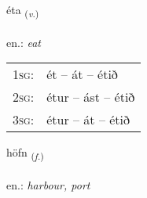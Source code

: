 \documentclass[frontgrid, backgrid]{flacards}\usepackage[]{graphicx}\usepackage[]{xcolor}
\begin{document}
\renewcommand{\flhead}{\vskip5pt \fboxsep=0pt {\small\bfseries\footnotesize Sagnorð | Verb}}
\renewcommand{\fcfoot}{\vskip5pt \fboxsep=0pt \hspace{2pt}{\small\bfseries\footnotesize 2K}}

\renewcommand{\blhead}{\vskip5pt {\small\bfseries\footnotesize Sagnorð | Verb }}
\renewcommand{\bcfoot}{\vskip5pt \hspace{2pt}{\small\bfseries\footnotesize 2K}}


{éta \small{\textsubscript{(\textit{v.})}} \\[1ex] %
\textphonetic{[jɛːta]} \\
en.: \emph{eat} \\  [2ex]
\renewcommand*{\arraystretch}{0.8}
\begin{tabular}{p{1cm}l}
\textsc{1sg}: & ét -- át -- étið \\ 
\textsc{2sg}: & étur -- ást -- étið \\ 
\textsc{3sg}: & étur -- át -- étið \\ 
\end{tabular}
}

\renewcommand{\flhead}{\vskip5pt \fboxsep=0pt {\small\bfseries\footnotesize Nafnorð | Noun}}
\renewcommand{\fcfoot}{\vskip5pt \fboxsep=0pt \hspace{2pt}{\small\bfseries\footnotesize 2K}}

\renewcommand{\blhead}{\vskip5pt {\small\bfseries\footnotesize Nafnorð | Noun }}
\renewcommand{\bcfoot}{\vskip5pt \hspace{2pt}{\small\bfseries\footnotesize 2K}}


{höfn \small{\textsubscript{(\textit{f.})}} \\[1ex] %
\textphonetic{[hœpn̥]} \\
en.: \emph{harbour, port} \\  [2ex]
\renewcommand*{\arraystretch}{0.8}
}
\end{document}
